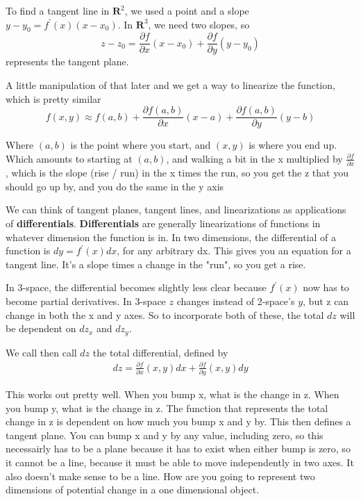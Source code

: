 \documentclass[12pt, letterpaper]{article}
\begin{document}
To find a tangent line in $\textbf{R}^2$, we used a point and a slope $y - y_0 = f^\prime (x)(x-x_0)$. In $\textbf{R}^3$, we need two slopes, so 
\begin{displaymath}
    z - z_0 = \frac{\partial f}{\partial x}(x - x_0) + \frac{\partial f}{\partial y}(y - y_0)
\end{displaymath}
represents the tangent plane.

A little manipulation of that later and we get a way to linearize the function, which is pretty similar
\begin{displaymath}
    f(x, y) \approx f(a, b) + \frac{\partial f(a, b)}{\partial x}(x - a) + \frac{\partial f(a, b)}{\partial y}(y - b)
\end{displaymath}

Where $(a, b)$ is the point where you start, and $(x, y)$ is where you end up. Which amounts to starting at $(a, b)$, and walking a bit in the x multiplied by $\frac{\partial f}{\partial x}$, which is the slope (rise / run) in the x times the run, so you get the z that you should go up by, and you do the same in the y axis

We can think of tangent planes, tangent lines, and linearizations as applications of \textbf{differentials}. \textbf{Differentials} are generally linearizations of functions in whatever dimension the function is in. In two dimensions, the differential of a function is $dy = f^\prime (x)dx$, for any arbitrary dx. This gives you an equation for a tangent line. It's a slope times a change in the "run", so you get a rise.

In 3-space, the differential becomes slightly less clear because $f^\prime (x)$ now has to become partial derivatives. In 3-space $z$ changes instead of 2-space's $y$, but z can change in both the x and y axes. So to incorporate both of these, the total $dz$ will be dependent on $dz_x$ and $dz_y$.

We call then call $dz$ the total differential, defined by
\begin{gather*}
    dz = \frac{\partial f}{\partial x}(x, y)dx + \frac{\partial f}{\partial y}(x, y)dy  
\end{gather*}

This works out pretty well. When you bump x, what is the change in z. When you bump y, what is the change in z. The function that represents the total change in z is dependent on how much you bump x and y by. This then defines a tangent plane. You can bump x and y by any value, including zero, so this necessairly has to be a plane because it has to exist when either bump is zero, so it cannot be a line, because it must be able to move independently in two axes. It also doesn't make sense to be a line. How are you going to represent two dimensions of potential change in a one dimensional object.
\end{document}
